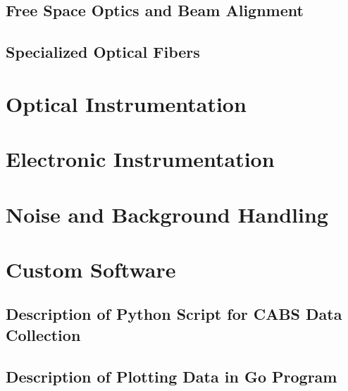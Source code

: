 \subsection{Free Space Optics and Beam Alignment}
\label{subsec:Experimental:Techniques:Alignment}


\subsection{Specialized Optical Fibers}
\label{subsec:Experimental:Techniques:Fibers}


\section{Optical Instrumentation}
\label{sec:Experimental:Optical Instrumentation}


\section{Electronic Instrumentation}
\label{sec:Experimental:Electronic Instrumentation}


\section{Noise and Background Handling}
\label{sec:Experimental:Noise}


\section{Custom Software}
\label{sec:Experimental:Software}


\subsection{Description of Python Script for CABS Data Collection}
\label{subsec:Experimental:Software:Python}


\subsection{Description of Plotting Data in Go Program}
\label{subsec:Experimental:Software:Go}
